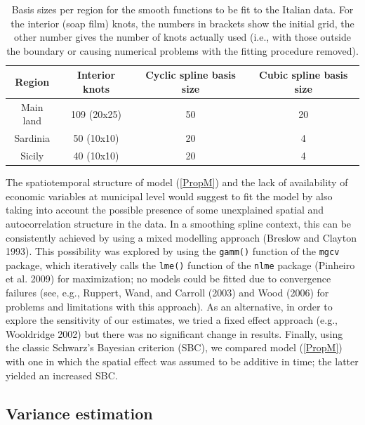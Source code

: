 \documentclass[10pt]{article}
\theoremstyle{definition}
\theoremstyle{plain}
\begin{document}
\begin{table}[htbp]
\centering
\begin{tabular}{c c c c}\\
\hline
\hline
Region & Interior knots & Cyclic spline basis size & Cubic spline basis size\\
\hline
Main land & 109 (20x25) & 50 & 20\\
Sardinia & 50 (10x10) & 20 & 4\\
Sicily & 40 (10x10) & 20 & 4\\
\hline
\hline
\end{tabular}
\caption{Basis sizes per region for the smooth functions to be fit to the Italian data. For the interior (soap film) knots, the numbers in brackets show the initial grid, the other number gives the number of knots actually used (i.e., with those outside the boundary or causing numerical problems with the fitting procedure removed).}
\label{soap-basis-table}
\end{table}

The spatiotemporal structure of model (\ref{PropM}) and the lack of availability of economic variables at municipal level would suggest to fit the model by also taking into account the possible presence of some unexplained spatial and autocorrelation structure in the data. In a smoothing spline context, this can be consistently achieved by using a mixed modelling approach (Breslow and Clayton 1993). This possibility was explored by using the \texttt{gamm()} function of the \texttt{mgcv} package, which iteratively calls the \texttt{lme()} function of the \texttt{nlme} package (Pinheiro et al. 2009) for maximization; no models could be fitted due to convergence failures (see, e.g., Ruppert, Wand, and Carroll (2003) and Wood (2006) for problems and limitations with this approach). As an alternative, in order to explore the sensitivity of our estimates, we tried a fixed effect approach (e.g., Wooldridge 2002) but there was no significant change in results. Finally, using the classic Schwarz's Bayesian criterion (SBC), we compared model (\ref{PropM}) with one in which the spatial effect was assumed to be additive in time; the latter yielded an increased SBC.     

\subsection{Variance estimation \label{VE}}
\end{document}
